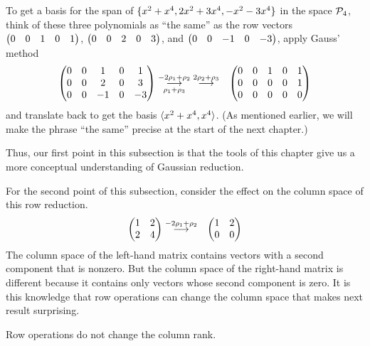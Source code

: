 \begin{example}
To get a basis for the span of
\( \set{x^2+x^4,2x^2+3x^4,-x^2-3x^4} \) in the space
\( \polyspace_4 \), think of these three polynomials 
as ``the same'' as the row vectors \( \rowvec{0 &0 &1 &0 &1} \),
\( \rowvec{0 &0 &2 &0 &3} \), and
\( \rowvec{0 &0 &-1 &0 &-3} \), apply Gauss' method
\begin{eqnarray*}
  \begin{pmatrix}
    0  &0  &1  &0  &1  \\
    0  &0  &2  &0  &3  \\
    0  &0  &-1 &0  &-3
  \end{pmatrix}
  &\grstep[\rho_1+\rho_3]{-2\rho_1+\rho_2}
  \;\grstep{2\rho_2+\rho_3}
  &\begin{pmatrix}
    0  &0  &1  &0  &1  \\
    0  &0  &0  &0  &1  \\
    0  &0  &0  &0  &0
  \end{pmatrix}
\end{eqnarray*}
and translate back to get the basis
\( \sequence{x^2+x^4,x^4} \).
(As mentioned earlier, 
we will make the phrase ``the same'' precise at the start of the next
chapter.)
\end{example}

Thus, our first point in this subsection is
that the tools of this chapter give us a more conceptual understanding of 
Gaussian reduction.

For the second point of this subsection,
consider the effect on the column space of this row reduction.
\begin{eqnarray*}
  \begin{pmatrix}
    1  &2  \\
    2  &4
  \end{pmatrix}
  &\grstep{-2\rho_1+\rho_2}
  &\begin{pmatrix}
    1  &2  \\
    0  &0
  \end{pmatrix}
\end{eqnarray*}
The column space of the left-hand matrix contains vectors with
a second component that is nonzero.
But the column space of the right-hand matrix is different because it
contains only vectors whose second component is zero.
It is this knowledge that row operations can change the column space that
makes next result surprising.

\begin{lemma} \label{le:RowOpsNoChngColRnk}
Row operations do not change the column rank.
\end{lemma}

